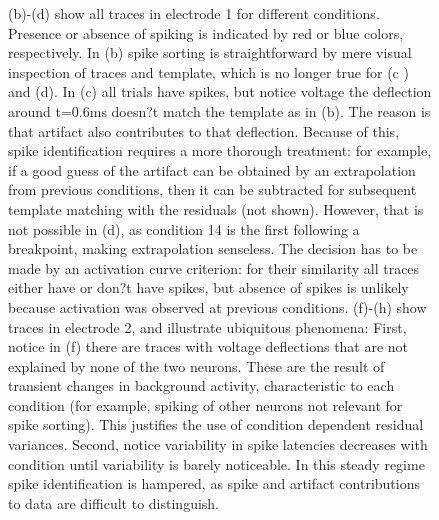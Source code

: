 \documentclass[12pt,letterpaper,fleqn]{article}
\begin{document}
\begin{figure}[ht!]
{(b)-(d) show all traces in electrode 1 for different conditions. Presence or absence of spiking is indicated by red or blue colors, respectively. In (b) spike sorting is straightforward by mere visual inspection of traces and template, which is no longer true for (c ) and (d). In (c) all trials have spikes, but notice voltage the deflection around t=0.6ms doesn?t match the template as in (b). The reason is that artifact also contributes to that deflection. Because of this, spike identification requires a more thorough treatment: for example, if a good guess of the artifact can be obtained by an extrapolation from previous conditions, then it can be subtracted for subsequent template matching with the residuals (not shown). However, that is not possible in (d), as condition 14 is the first following a breakpoint, making extrapolation senseless. The decision has to be made by an activation curve criterion: for their similarity all traces either have or don?t have spikes, but absence of spikes is unlikely because activation was observed at previous conditions. (f)-(h) show traces in electrode 2, and illustrate ubiquitous phenomena: First, notice in (f) there are traces with voltage deflections that are not explained by none of the two neurons. These are the result of transient changes in background activity, characteristic to each condition (for example, spiking of other neurons not relevant for spike sorting). This justifies the use of condition dependent residual variances. Second, notice variability in spike latencies decreases with condition until variability is barely noticeable. In this steady regime spike identification is hampered, as spike and artifact contributions to data are difficult to distinguish. }
\label{fig:traces}
\end{figure}
\pagebreak
\graphicspath{ {./FiguresMethods/AlgExample/} }
\end{document}
